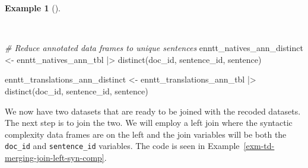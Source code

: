 \documentclass[
  letterpaper,
]{latex/krantz}
\newenvironment{Shaded}{\begin{snugshade}}{\end{snugshade}}
\newcommand{\CommentTok}[1]{\textcolor[rgb]{0.00,0.00,0.00}{\textit{#1}}}
\newcommand{\FunctionTok}[1]{\textcolor[rgb]{0.00,0.00,0.00}{#1}}
\newcommand{\NormalTok}[1]{\textcolor[rgb]{0.00,0.00,0.00}{#1}}
\newcommand{\OtherTok}[1]{\textcolor[rgb]{0.00,0.00,0.00}{#1}}
\newcommand{\SpecialCharTok}[1]{\textcolor[rgb]{0.00,0.00,0.00}{#1}}
\theoremstyle{definition}
\newtheorem{example}{Example}[chapter]
\theoremstyle{remark}
\begin{document}
\begin{example}[]\protect\hypertarget{exm-td-merging-annotation-distinct}{}\label{exm-td-merging-annotation-distinct}

~

\begin{Shaded}
\begin{Highlighting}[]
\CommentTok{\# Reduce annotated data frames to unique sentences}
\NormalTok{enntt\_natives\_ann\_distinct }\OtherTok{\textless{}{-}}
\NormalTok{  enntt\_natives\_ann\_tbl }\SpecialCharTok{|\textgreater{}}
  \FunctionTok{distinct}\NormalTok{(doc\_id, sentence\_id, sentence)}

\NormalTok{enntt\_translations\_ann\_distinct }\OtherTok{\textless{}{-}}
\NormalTok{  enntt\_translations\_ann\_tbl }\SpecialCharTok{|\textgreater{}}
  \FunctionTok{distinct}\NormalTok{(doc\_id, sentence\_id, sentence)}
\end{Highlighting}
\end{Shaded}

\end{example}

We now have two datasets that are ready to be joined with the recoded
datasets. The next step is to join the two. We will employ a left join
where the syntactic complexity data frames are on the left and the join
variables will be both the \texttt{doc\_id} and \texttt{sentence\_id}
variables. The code is seen in
Example~\ref{exm-td-merging-join-left-syn-comp}.
\end{document}
